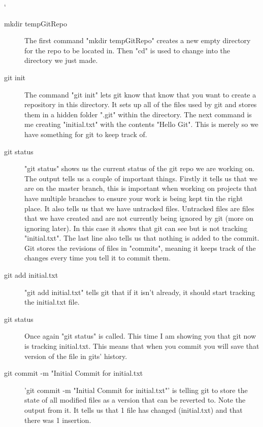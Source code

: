 `\documentclass[a4paper,11pt]{report}
\begin{document}
\begin{description}
							

							\begin{description}
								\item[mkdir tempGitRepo]
									The first command "mkdir tempGitRepo" creates a new empty directory for the repo to be located in.
									Then "cd" is used to change into the directory we just made.

								\item[git init]
									The command "git init" lets git know that know that you want to create a repository in this directory.
									It sets up all of the files used by git and stores them in a hidden folder ".git" within the directory.
									The next command is me creating "initial.txt" with the contents "Hello Git".
									This is merely so we have something for git to keep track of.
								\item[git status]
									"git status" shows us the current status of the git repo we are working on.
									The output tells us a couple of important things.
									Firstly it tells us that we are on the master branch, this is important when working on projects that have multiple branches to ensure your work is being kept tin the right place.
									It also tells us that we have untracked files.
									Untracked files are files that we have created and are not currently being ignored by git (more on ignoring later).
									In this case it shows that git can see but is not tracking "initial.txt".
									The last line also tells us that nothing is added to the commit.
									Git stores the revisions of files in "commits", meaning it keeps track of the changes every time you tell it to commit them.
								\item[git add initial.txt]
									"git add initial.txt" tells git that if it isn't already, it should start tracking the initial.txt file.
								\item[git status]
									Once again "git status" is called. This time I am showing you that git now is tracking initial.txt.
									This means that when you commit you will save that version of the file in gits' history.
								\item[git commit -m "Initial Commit for initial.txt]
									'git commit -m "Initial Commit for initial.txt"' is telling git to store the state of all modified files as a version that can be reverted to.
									Note the output from it. It tells us that 1 file has changed (initial.txt) and that there was 1 insertion.

\end{description}
\end{description}
\end{document}
